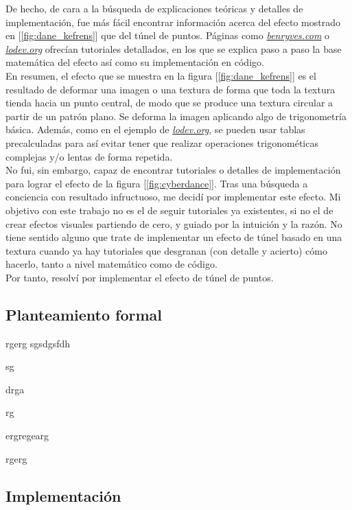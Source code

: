 De hecho, de cara a la búsqueda de explicaciones teóricas y detalles de implementación, fue más fácil encontrar información acerca del efecto mostrado en [\ref{fig:dane_kefrens}] que del túnel de puntos. Páginas como \emph{\href{http://benryves.com/tutorials/tunnel}{benryves.com}} o \emph{\href{https://lodev.org/cgtutor/tunnel.html}{lodev.org}} ofrecían tutoriales detallados, en los que se explica paso a paso la base matemática del efecto así como su implementación en código.\\

En resumen, el efecto que se muestra en la figura [\ref{fig:dane_kefrens}] es el resultado de deformar una imagen o una textura de forma que toda la textura tienda hacia un punto central, de modo que se produce una textura circular a partir de un patrón plano. Se deforma la imagen aplicando algo de trigonometría básica. Además, como en el ejemplo de \emph{\href{https://lodev.org/cgtutor/tunnel.html}{lodev.org}}, se pueden usar tablas precalculadas para así evitar tener que realizar operaciones trigonométicas complejas y/o lentas de forma repetida.\\

No fui, sin embargo, capaz de encontrar tutoriales o detalles de implementación para lograr el efecto de la figura [\ref{fig:cyberdance}]. Tras una búsqueda a conciencia con resultado infructuoso, me decidí por implementar este efecto. Mi objetivo con este trabajo no es el de seguir tutoriales ya existentes, si no el de crear efectos visuales partiendo de cero, y guiado por la intuición y la razón. No tiene sentido alguno que trate de implementar un efecto de túnel basado en una textura cuando ya hay tutoriales que desgranan (con detalle y acierto) cómo hacerlo, tanto a nivel matemático como de código.\\

Por tanto, resolví por implementar el efecto de túnel de puntos.

\subsection{Planteamiento formal}

rgerg
sgsdgsfdh

sg

drga

rg

ergregearg

rgerg

\subsection{Implementación}

